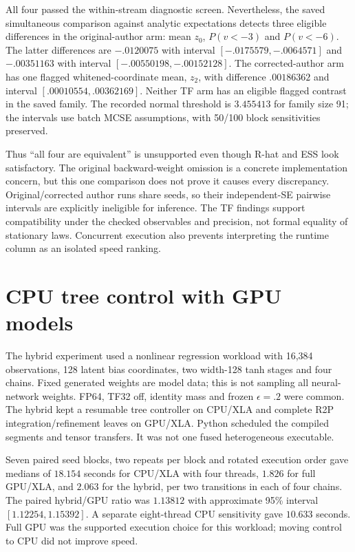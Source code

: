All four passed the within-stream diagnostic screen. Nevertheless, the
saved simultaneous comparison against analytic expectations detects three
eligible differences in the original-author arm: mean $z_0$,
$P(v<-3)$ and $P(v<-6)$. The latter differences are $-.0120075$
with interval $[-.0175579,-.0064571]$ and $-.00351163$ with interval
$[-.00550198,-.00152128]$. The corrected-author arm has one flagged
whitened-coordinate mean, $z_2$, with difference $.00186362$ and
interval $[.00010554,.00362169]$. Neither TF arm has an eligible flagged
contrast in the saved family. The recorded normal threshold is $3.455413$
for family size 91; the intervals use batch MCSE assumptions, with 50/100
block sensitivities preserved.

Thus ``all four are equivalent'' is unsupported even though R-hat and
ESS look satisfactory. The original backward-weight omission is a concrete
implementation concern, but this one comparison does not prove it causes
every discrepancy. Original/corrected author runs share seeds, so their
independent-SE pairwise intervals are explicitly ineligible for inference.
The TF findings support compatibility under the checked observables and
precision, not formal equality of stationary laws. Concurrent execution
also prevents interpreting the runtime column as an isolated speed ranking.

\section{CPU tree control with GPU models}
\label{sec:sw-placement}

The hybrid experiment used a nonlinear regression workload with 16,384
observations, 128 latent bias coordinates, two width-128 tanh stages and
four chains. Fixed generated weights are model data; this is not sampling
all neural-network weights. FP64, TF32 off, identity mass and frozen
$\epsilon=.2$ were common. The hybrid kept a resumable tree controller
on CPU/XLA and complete R2P integration/refinement leaves on GPU/XLA.
Python scheduled the compiled segments and tensor transfers. It was not
one fused heterogeneous executable.

Seven paired seed blocks, two repeats per block and rotated execution order
gave medians of $18.154$ seconds for CPU/XLA with four threads, $1.826$
for full GPU/XLA, and $2.063$ for the hybrid, per two transitions in each
of four chains. The paired hybrid/GPU ratio was $1.13812$ with approximate
95\% interval $[1.12254,1.15392]$. A separate eight-thread CPU sensitivity
gave $10.633$ seconds. Full GPU was the supported execution choice for
this workload; moving control to CPU did not improve speed.

